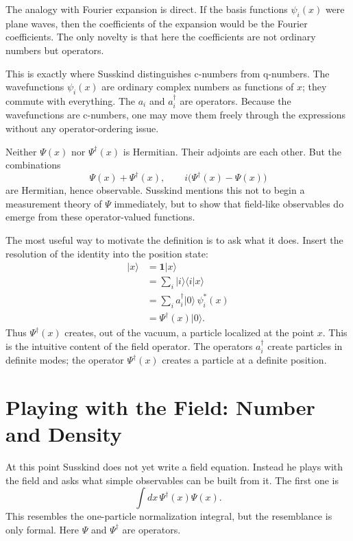 The analogy with Fourier expansion is direct. If the basis functions $\psi_i(x)$ were plane waves, then the coefficients of the expansion would be the Fourier coefficients. The only novelty is that here the coefficients are not ordinary numbers but operators.

This is exactly where Susskind distinguishes c-numbers from q-numbers. The wavefunctions $\psi_i(x)$ are ordinary complex numbers as functions of $x$; they commute with everything. The $a_i$ and $a_i^\dagger$ are operators. Because the wavefunctions are c-numbers, one may move them freely through the expressions without any operator-ordering issue.

Neither $\Psi(x)$ nor $\Psi^\dagger(x)$ is Hermitian. Their adjoints are each other. But the combinations
\begin{equation}
\Psi(x)+\Psi^\dagger(x),
\qquad
i\bigl(\Psi^\dagger(x)-\Psi(x)\bigr)
\end{equation}
are Hermitian, hence observable. Susskind mentions this not to begin a measurement theory of $\Psi$ immediately, but to show that field-like observables do emerge from these operator-valued functions.

The most useful way to motivate the definition is to ask what it does. Insert the resolution of the identity into the position state:
\begin{align}
|x\rangle
&=\mathbf{1}|x\rangle \\
&=\sum_i |i\rangle\langle i|x\rangle \\
&=\sum_i a_i^\dagger|0\rangle\,\psi_i^*(x) \\
&=\Psi^\dagger(x)|0\rangle.
\end{align}
Thus $\Psi^\dagger(x)$ creates, out of the vacuum, a particle localized at the point $x$. This is the intuitive content of the field operator. The operators $a_i^\dagger$ create particles in definite modes; the operator $\Psi^\dagger(x)$ creates a particle at a definite position.

\section{Playing with the Field: Number and Density}

At this point Susskind does not yet write a field equation. Instead he plays with the field and asks what simple observables can be built from it. The first one is
\begin{equation}
\int dx\,\Psi^\dagger(x)\Psi(x).
\end{equation}
This resembles the one-particle normalization integral, but the resemblance is only formal. Here $\Psi$ and $\Psi^\dagger$ are operators.

